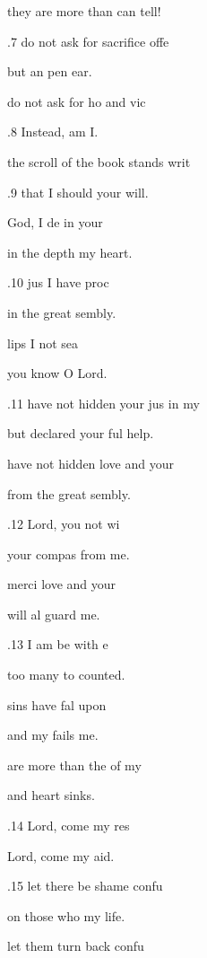 they are more than  can tell! 

.7  do not ask for sacrifice  offe 

but an pen ear. 

 do not ask for ho and vic 

.8 Instead,  am I. 

 the scroll of the book  stands writ 

.9 that I should  your will. 

 God, I de in your  

in the depth  my heart. 

.10  jus I have proc 

in the great sembly. 

 lips I  not sea 

you know  O Lord. 

.11  have not hidden your jus in my  

but declared your ful help. 

 have not hidden  love and your  

from the great sembly. 

.12  Lord, you  not wi 

your compas from me. 

 merci love and your  

will al guard me. 

.13  I am be with e 

too many to  counted. 

 sins have fal upon  

and my  fails me. 

 are more than the  of my  

and  heart sinks. 

.14  Lord, come  my res 

Lord, come  my aid. 

.15  let there be shame  confu 

on those who  my life. 

 let them turn back  confu 

